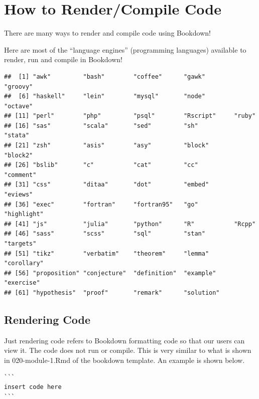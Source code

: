 \documentclass[
]{book}
\newenvironment{Shaded}{\begin{snugshade}}{\end{snugshade}}
\newcommand{\FunctionTok}[1]{\textcolor[rgb]{0.13,0.29,0.53}{\textbf{#1}}}
\newcommand{\NormalTok}[1]{#1}
\newcommand{\SpecialCharTok}[1]{\textcolor[rgb]{0.81,0.36,0.00}{\textbf{#1}}}
\theoremstyle{definition}
\theoremstyle{definition}
\theoremstyle{definition}
\theoremstyle{definition}
\theoremstyle{remark}
\begin{document}
\chapter{How to Render/Compile Code}\label{render-code}

There are many ways to render and compile code using Bookdown!

Here are most of the ``language engines'' (programming languages) available to render, run and compile in Bookdown!

\begin{Shaded}
\end{Shaded}

\begin{verbatim}
##  [1] "awk"         "bash"        "coffee"      "gawk"        "groovy"     
##  [6] "haskell"     "lein"        "mysql"       "node"        "octave"     
## [11] "perl"        "php"         "psql"        "Rscript"     "ruby"       
## [16] "sas"         "scala"       "sed"         "sh"          "stata"      
## [21] "zsh"         "asis"        "asy"         "block"       "block2"     
## [26] "bslib"       "c"           "cat"         "cc"          "comment"    
## [31] "css"         "ditaa"       "dot"         "embed"       "eviews"     
## [36] "exec"        "fortran"     "fortran95"   "go"          "highlight"  
## [41] "js"          "julia"       "python"      "R"           "Rcpp"       
## [46] "sass"        "scss"        "sql"         "stan"        "targets"    
## [51] "tikz"        "verbatim"    "theorem"     "lemma"       "corollary"  
## [56] "proposition" "conjecture"  "definition"  "example"     "exercise"   
## [61] "hypothesis"  "proof"       "remark"      "solution"
\end{verbatim}

\section{Rendering Code}\label{rendering-code}

Just rendering code refers to Bookdown formatting code so that our users can view it. The code does not run or compile. This is very similar to what is shown in 020-module-1.Rmd of the bookdown template. An example is shown below.

\begin{verbatim}
```
insert code here
```
\end{verbatim}
\end{document}
